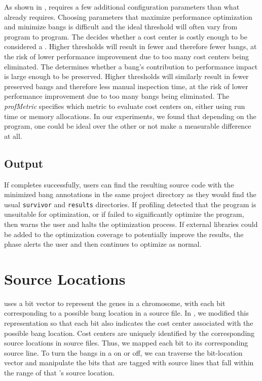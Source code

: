 As shown in , \At{} requires a few additional
configuration parameters than what \Ao{} already requires.
Choosing parameters that maximize performance optimization
and minimize bangs is difficult and the ideal threshold
will often vary from program to program. The \hotspotcost{} decides
whether a cost center is costly enough to be considered a \hotspot{}.
Higher \hotspotcost{} thresholds will result in fewer \hotspots{} and therefore
fewer bangs, at the risk of lower performance improvement due to too
many cost centers being eliminated. The \absim{} determines whether
a bang's contribution to performance impact is large enough to be preserved.
Higher \absim{} thresholds will similarly result in fewer preserved bangs
and therefore less manual inspection time, at the risk of lower performance
improvement due to too many bangs being eliminated. The \textit{profMetric} specifies
which metric to evaluate cost centers on, either using run time or memory
allocations. In our experiments, we found that depending on the program,
one \profm{} could be ideal over the other or not make a measurable
difference at all.


\subsection{\At{} Output}

If \At{} completes successfully, users can find the resulting source
code with the minimized bang annotations in the same project
directory as they would find the usual \Ao{} \texttt{survivor}
and \texttt{results} directories. If \preopt{} profiling detected that
the program is unsuitable for optimization, or if \Ao{} failed to
significantly optimize the program, then \At{} warns the user and
halts the optimization process. If external libraries could be added to
the optimization coverage to potentially improve the results,
the \preopt{} phase alerts the user and then continues to optimize as
normal.


\section{Source Locations}

\Ao{} uses a bit vector to represent the genes in a
chromosome, with each bit corresponding to a possible bang location in
a source file.  In \At{}, we modified this representation so that each
bit also indicates the cost center associated with the possible bang
location.   Cost centers are uniquely identified by the corresponding source
locations in source files.  Thus, we mapped each bit to its corresponding
source line. To turn the bangs in a \hotspot{} on or off, we can
traverse the bit-location vector and manipulate the bits that are
tagged with source lines that fall within the range of
that \hotspot{}'s source location.

